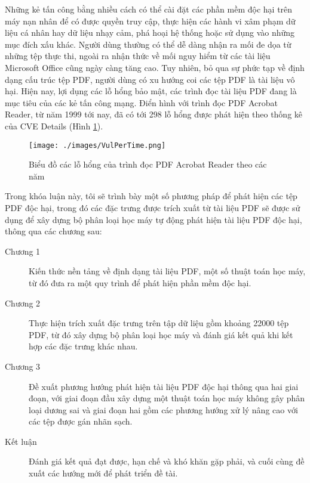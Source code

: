 \documentclass[./../main.tex]{subfiles}
\begin{document}
Những kẻ tấn công bằng nhiều cách có thể cài đặt các phần mềm độc hại trên máy nạn nhân để có được quyền truy cập, thực hiện các hành vi xâm phạm dữ liệu cá nhân hay dữ liệu nhạy cảm, phá hoại hệ thống hoặc sử dụng vào những mục đích xấu khác. Người dùng thường có thể dễ dàng nhận ra mối đe dọa từ những tệp thực thi, ngoài ra nhận thức về mối nguy hiểm từ các tài liệu Microsoft Office cũng ngày càng tăng cao. Tuy nhiên, bỏ qua sự phức tạp về định dạng cấu trúc tệp PDF, người dùng có xu hướng coi các tệp PDF là tài liệu vô hại.
Hiện nay, lợi dụng các lỗ hổng bảo mật, các trình đọc tài liệu PDF đang là mục tiêu của các kẻ tấn công mạng. Điển hình với trình đọc PDF Acrobat Reader, từ năm 1999 tới nay, đã có tới 298 lỗ hổng được phát hiện theo thống kê của CVE Details \footnotemark (Hình \ref{fig:acrobatcve}).

\begin{figure}[ht!]
	\texttt{[image: ./images/VulPerTime.png]}
	\caption{Biểu đồ các lỗ hổng của trình đọc PDF Acrobat Reader theo các năm\protect\footnotemark}
	\label{fig:acrobatcve}
\end{figure}

Trong khóa luận này, tôi sẽ trình bày một số phương pháp để phát hiện các tệp PDF độc hại, trong đó các đặc trưng được trích xuất từ tài liệu PDF sẽ được sử dụng để xây dựng bộ phân loại học máy tự động phát hiện tài liệu PDF độc hại, thông qua các chương sau:
\begin{description}
	\item [Chương 1] Kiến thức nền tảng về định dạng tài liệu PDF, một số thuật toán học máy, từ đó đưa ra một quy trình để phát hiện phần mềm độc hại.
	\item [Chương 2] Thực hiện trích xuất đặc trưng trên tập dữ liệu gồm khoảng 22000 tệp PDF, từ đó xây dựng bộ phân loại học máy và đánh giá kết quả khi kết hợp các đặc trưng khác nhau.
	\item [Chương 3] Đề xuất phương hướng phát hiện tài liệu PDF độc hại thông qua hai giai đoạn, với giai đoạn đầu xây dựng một thuật toán học máy không gây phân loại dương sai và giai đoạn hai gồm các phương hướng xử lý nâng cao với các tệp được gán nhãn sạch.
	\item [Kết luận] Đánh giá kết quả đạt được, hạn chế và khó khăn gặp phải, và cuối cùng đề xuất các hướng mới để phát triển đề tài.
\end{description}
\end{document}
